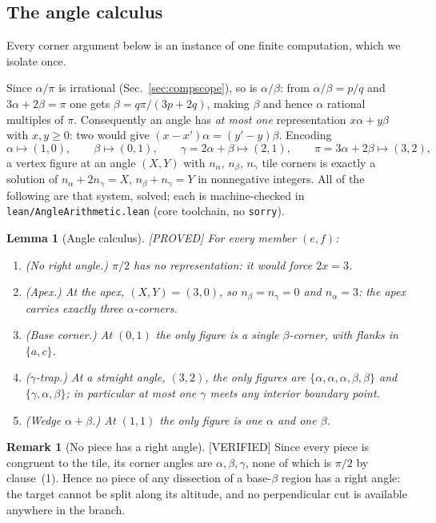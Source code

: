 \documentclass[11pt,reqno]{amsart}
\theoremstyle{plain}
\newtheorem{lemma}[theorem]{Lemma}
\theoremstyle{definition}
\newtheorem{remark}[theorem]{Remark}
\newcommand{\lab}[1]{\hfill\textnormal{\footnotesize\textsc{[#1]}}}
\begin{document}
\subsection{The angle calculus}\label{sub:anglecalc}
Every corner argument below is an instance of one finite computation, which we isolate once.

Since $\alpha/\pi$ is irrational (Sec.~\ref{sec:compscope}), so is $\alpha/\beta$: from
$\alpha/\beta=p/q$ and $3\alpha+2\beta=\pi$ one gets $\beta=q\pi/(3p+2q)$, making $\beta$ and hence
$\alpha$ rational multiples of $\pi$. Consequently an angle has \emph{at most one} representation
$x\alpha+y\beta$ with $x,y\ge0$: two would give $(x-x')\alpha=(y'-y)\beta$. Encoding
\[
\alpha\mapsto(1,0),\qquad \beta\mapsto(0,1),\qquad \gamma=2\alpha+\beta\mapsto(2,1),\qquad
\pi=3\alpha+2\beta\mapsto(3,2),
\]
a vertex figure at an angle $(X,Y)$ with $n_\alpha$, $n_\beta$, $n_\gamma$ tile corners is exactly a
solution of $n_\alpha+2n_\gamma=X$, $n_\beta+n_\gamma=Y$ in nonnegative integers. All of the
following are that system, solved; each is machine-checked in
\textup{\texttt{lean/AngleArithmetic.lean}} (core toolchain, no \texttt{sorry}).

\begin{lemma}[Angle calculus]\label{lem:anglecalc}\lab{PROVED}
For every member $(e,f)$:
\begin{enumerate}
\item \textup{(No right angle.)} $\pi/2$ has no representation: it would force $2x=3$.
\item \textup{(Apex.)} At the apex, $(X,Y)=(3,0)$, so $n_\beta=n_\gamma=0$ and $n_\alpha=3$: the
apex carries exactly three $\alpha$-corners.
\item \textup{(Base corner.)} At $(0,1)$ the only figure is a single $\beta$-corner, with flanks in
$\{a,c\}$.
\item \textup{($\gamma$-trap.)} At a straight angle, $(3,2)$, the only figures are
$\{\alpha,\alpha,\alpha,\beta,\beta\}$ and $\{\gamma,\alpha,\beta\}$; in particular at most one
$\gamma$ meets any interior boundary point.
\item \textup{(Wedge $\alpha+\beta$.)} At $(1,1)$ the only figure is one $\alpha$ and one $\beta$.
\end{enumerate}
\end{lemma}

\begin{remark}[No piece has a right angle]\label{rem:norightangle}\lab{VERIFIED}
Since every piece is congruent to the tile, its corner angles are $\alpha,\beta,\gamma$, none of
which is $\pi/2$ by clause~(1). Hence no piece of any dissection of a base-$\beta$ region has a
right angle: the target cannot be split along its altitude, and no perpendicular cut is available
anywhere in the branch.
\end{remark}
\end{document}
